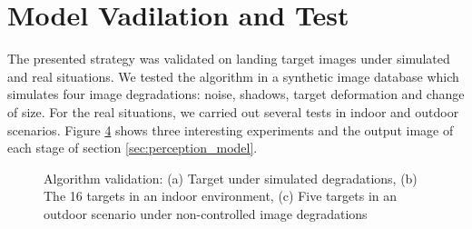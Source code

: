 \section{Model Vadilation and Test}\label{sec:validation_and_test}
The presented strategy was validated on landing target images under simulated and real situations. We tested the algorithm in a synthetic image database which simulates four image degradations: noise, shadows, target deformation and change of size. For the real situations, we carried out several tests in indoor and outdoor scenarios. Figure \ref{fig:validation} shows three interesting experiments and the output image of each stage of section \ref{sec:perception_model}. 

\begin{figure}[h!]
\centering
\begin{subfigure}[t]{\textwidth+20pt\relax}
    \caption{} \label{fig:synthetic_result}
\end{subfigure}\hfill
\begin{subfigure}[t]{0.30\textwidth}
    \caption{} \label{fig:indoor_result}
\end{subfigure}\hfill
\begin{subfigure}[t]{0.30\textwidth}
    \caption{}  \label{fig:outdoor_result}
\end{subfigure}
\caption{Algorithm validation: (a) Target under simulated degradations, (b) The 16 targets in an indoor environment, (c) Five targets in an outdoor scenario under non-controlled image degradations}\label{fig:validation}
\end{figure}

